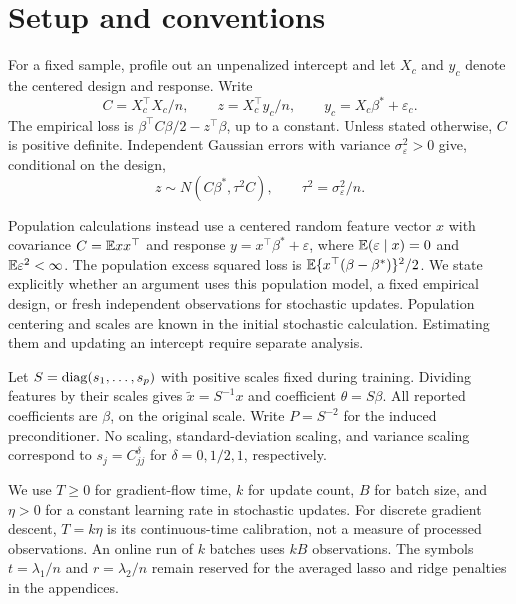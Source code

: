 \section{Setup and conventions}

For a fixed sample, profile out an unpenalized intercept and let $X_c$ and $y_c$
denote the centered design and response. Write
\[
 C = X_c^\top X_c/n,\qquad z
   = X_c^\top y_c/n,\qquad y_c
   = X_c\beta^* + \varepsilon_c.
\]
The empirical loss is $\beta^\top C\beta/2 - z^\top\beta$, up to a constant.
Unless stated otherwise, $C$ is positive definite. Independent Gaussian errors
with variance $\sigma_\varepsilon^2 > 0$ give, conditional on the design,
\begin{equation}
 \label{eq:score-law}
 z \sim N(C\beta^*,\tau^2C),\qquad \tau^2 = \sigma_\varepsilon^2/n.
\end{equation}

Population calculations instead use a centered random feature vector $x$ with
covariance $C = \mathbb{E} xx^\top$ and response $y = x^\top\beta^* + \varepsilon$,
where $\mathbb{E}(\varepsilon \mid x) = 0$ and $\mathbb{E}\varepsilon^2 < \infty$. The
population excess squared loss is $\mathbb{E}\{x^\top(\beta - \beta^*)\}^2/2$. We state
explicitly whether an argument uses this population model, a fixed empirical
design, or fresh independent observations for stochastic updates. Population
centering and scales are known in the initial stochastic calculation. Estimating
them and updating an intercept require separate analysis.

Let $S = \operatorname{diag}(s_1,\ldots,s_p)$ with positive scales fixed during training.
Dividing features by their scales gives $\widetilde x = S^{-1}x$ and coefficient
$\theta = S\beta$. All reported coefficients are $\beta$, on the original scale.
Write $P = S^{-2}$ for the induced preconditioner. No scaling,
standard-deviation scaling, and variance scaling correspond to
$s_j = C_{jj}^{\delta}$ for $\delta = 0,1/2,1$, respectively.

We use $T \ge 0$ for gradient-flow time, $k$ for update count, $B$ for batch
size, and $\eta > 0$ for a constant learning rate in stochastic updates. For
discrete gradient descent, $T = k\eta$ is its continuous-time calibration, not a
measure of processed observations. An online run of $k$ batches uses $kB$
observations. The symbols $t = \lambda_1/n$ and $r = \lambda_2/n$ remain
reserved for the averaged lasso and ridge penalties in the appendices.
